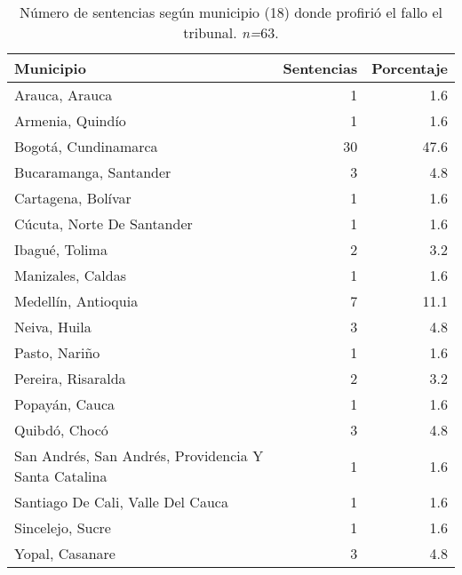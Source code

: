 \begin{table}[!htbp]
\centering
\caption{Número de sentencias según municipio (18) donde profirió el fallo el tribunal. \textit{n=}63.} 
\label{tab:munfal}
\begin{tabular}{lrr}
  \hline
Municipio & Sentencias & Porcentaje \\ 
  \hline
Arauca, Arauca &  1 & 1.6 \\ 
  Armenia, Quindío &  1 & 1.6 \\ 
  Bogotá, Cundinamarca & 30 & 47.6 \\ 
  Bucaramanga, Santander &  3 & 4.8 \\ 
  Cartagena, Bolívar &  1 & 1.6 \\ 
  Cúcuta, Norte De Santander &  1 & 1.6 \\ 
  Ibagué, Tolima &  2 & 3.2 \\ 
  Manizales, Caldas &  1 & 1.6 \\ 
  Medellín, Antioquia &  7 & 11.1 \\ 
  Neiva, Huila &  3 & 4.8 \\ 
  Pasto, Nariño &  1 & 1.6 \\ 
  Pereira, Risaralda &  2 & 3.2 \\ 
  Popayán, Cauca &  1 & 1.6 \\ 
  Quibdó, Chocó &  3 & 4.8 \\ 
  San Andrés, San Andrés, Providencia Y Santa Catalina &  1 & 1.6 \\ 
  Santiago De Cali, Valle Del Cauca &  1 & 1.6 \\ 
  Sincelejo, Sucre &  1 & 1.6 \\ 
  Yopal, Casanare &  3 & 4.8 \\ 
   \hline
\end{tabular}
\end{table}

